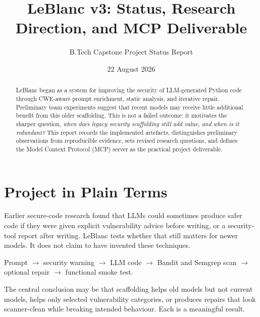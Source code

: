 \documentclass[11pt,a4paper]{article}
\title{LeBlanc v3: Status, Research Direction, and MCP Deliverable}
\author{B.Tech Capstone Project Status Report}
\date{22 August 2026}
\begin{document}
\maketitle

\begin{abstract}
LeBlanc began as a system for improving the security of LLM-generated Python code through CWE-aware prompt enrichment, static analysis, and iterative repair. Preliminary team experiments suggest that recent models may receive little additional benefit from this older scaffolding. This is not a failed outcome: it motivates the sharper question, \emph{when does legacy security scaffolding still add value, and when is it redundant?} This report records the implemented artefacts, distinguishes preliminary observations from reproducible evidence, sets revised research questions, and defines the Model Context Protocol (MCP) server as the practical project deliverable.
\end{abstract}

\section{Project in Plain Terms}
Earlier secure-code research found that LLMs could sometimes produce safer code if they were given explicit vulnerability advice before writing, or a security-tool report after writing. LeBlanc tests whether that still matters for newer models. It does not claim to have invented these techniques.

\begin{center}
Prompt $\rightarrow$ security warning $\rightarrow$ LLM code $\rightarrow$ Bandit and Semgrep scan $\rightarrow$ optional repair $\rightarrow$ functional smoke test.
\end{center}

The central conclusion may be that scaffolding helps old models but not current models, helps only selected vulnerability categories, or produces repairs that look scanner-clean while breaking intended behaviour. Each is a meaningful result.
\end{document}
